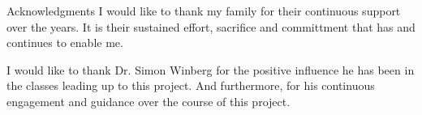 \begin{centerpage}{Acknowledgments}
I would like to thank my family for their continuous support over the years.
    It is their sustained effort, sacrifice and committment that has and
    continues to enable me.

I would like to thank Dr. Simon Winberg for the positive influence he has been in
    the classes leading up to this project. And furthermore, for his continuous
    engagement and guidance over the course of this project. 

\end{centerpage}
